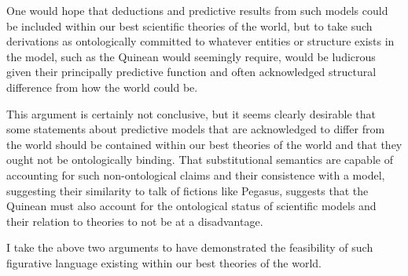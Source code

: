 One would hope that deductions and predictive results from such models
could be included within our best scientific theories of the world,
but to take such derivations as ontologically committed to whatever
entities or structure exists in the model, such as the Quinean would
seemingly require, would be ludicrous given their principally
predictive function and often acknowledged structural difference from
how the world could be.  

This argument is certainly not conclusive, but it seems clearly
desirable that some statements about predictive models that are
acknowledged to differ from the world should be contained within our
best theories of the world and that they ought not be ontologically
binding.  That substitutional semantics are capable of accounting for
such non-ontological claims and their consistence with a model,
suggesting their similarity to talk of fictions like Pegasus, suggests
that the Quinean must also account for the ontological status of
scientific models and their relation to theories to not be at a
disadvantage.

I take the above two arguments to have demonstrated the feasibility of
such figurative language existing within our best theories of the
world.

